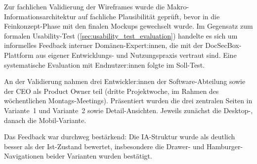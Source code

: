 Zur fachlichen Validierung der Wireframes wurde die Makro-Informationsarchitektur auf fachliche Plausibilität geprüft, bevor in die Feinkonzept-Phase mit den finalen Mockups gewechselt wurde. Im Gegensatz zum formalen Usability-Test (\autoref{sec:usability_test_evaluation}) handelte es sich um informelles Feedback interner Domänen-Expert:innen, die mit der DocSecBox-Plattform aus eigener Entwicklungs- und Nutzungspraxis vertraut sind. Eine systematische Evaluation mit Endnutzer:innen folgte im Soll-Test.

An der Validierung nahmen drei Entwickler:innen der Software-Abteilung sowie der CEO als Product Owner teil (dritte Projektwoche, im Rahmen des wöchentlichen Montags-Meetings). Präsentiert wurden die drei zentralen Seiten in Variante~1 und Variante~2 sowie Detail-Ansichten. Jeweils zunächst die Desktop-, danach die Mobil-Variante.

Das Feedback war durchweg bestärkend: Die IA-Struktur wurde als deutlich besser als der Ist-Zustand bewertet, insbesondere die Drawer- und Hamburger-Navigationen beider Varianten wurden bestätigt.
